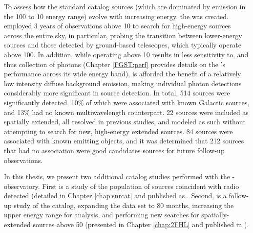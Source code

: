 To assess how the standard \lat{} catalog sources (which are dominated by \gam{} emission in the 100\mev{} to 10\gev{} energy range) evolve with increasing energy, the \onefhl{} \citep{1FHL} was created. \onefhl{} employed 3 years of \lat{} observations above 10\gev{} to search for high-energy \gam{} sources across the entire sky,  in particular,  probing the transition between lower-energy \lat{} sources and those detected by ground-based \gam{} telescopes, which typically operate above 100\gev{}. In addition, while operating above 10\gev{} results in less sensitivity to, and thus collection of \gam{} photons (Chapter \ref{FGST:perf} provides details on the \lat{}'s performance across its wide energy band), \onefhl{} is afforded the benefit of a relatively low intensity diffuse background emission, making individual photon detections considerably more significant in source detection.  In total, 514 sources were significantly detected, 10\% of which were associated with known Galactic sources, and 13\% had no known multiwavelength counterpart. 22 sources were included as spatially extended, all resolved in previous \lat{} studies, and modeled as such without attempting to search for new, high-energy extended sources. 84 sources were associated with known \tev{} emitting objects, and it was determined that 212 sources that had no\tev{} association were good candidates sources for future\tev{} follow-up observations.
	
In this thesis, we present two additional catalog studies performed with the \Fermi{}-\lat{} observatory. First is a study of the population of \gam{} sources coincident with radio detected \snrs{} (detailed in Chapter \ref{chap:snrcat} and published as \cite{snrCat}. Second, is a follow-up study of the \onefhl{} catalog, expanding the data set to 80 months, increasing the upper energy range for analysis, and performing new searches for spatially-extended sources above 50\gev{} (presented in Chapter \ref{chap:2FHL} and published in \cite{2FHL}).

